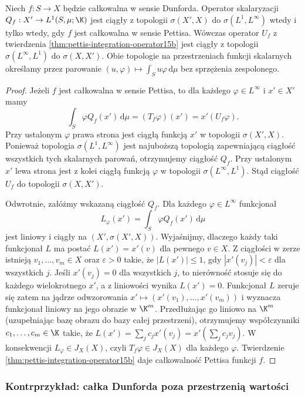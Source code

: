 \begin{wniosek}
\label{cor:pettis-weakstar-operator15b}
Niech $f:S\to X$ będzie całkowalna w sensie Dunforda.
Operator skalaryzacji
$Q_f:X'\to L^1(S,\mu;\K)$ jest ciągły z topologii
$\sigma(X',X)$ do $\sigma(L^1,L^\infty)$ wtedy i tylko wtedy,
gdy $f$ jest całkowalna w sensie Pettisa.
Wówczas operator $U_f$ z twierdzenia
\ref{thm:pettis-integration-operator15b} jest ciągły
z topologii $\sigma(L^\infty,L^1)$ do $\sigma(X,X')$.
Obie topologie na przestrzeniach funkcji skalarnych
określamy przez parowanie
$(u,\varphi)\mapsto\int_Su\varphi\,\mathrm d\mu$
bez sprzężenia zespolonego.
\end{wniosek}
\begin{proof}
Jeżeli $f$ jest całkowalna w sensie Pettisa, to dla
każdego $\varphi\in L^\infty$ i $x'\in X'$ mamy
\[
 \int_S\varphi Q_f(x')\,\mathrm d\mu
 = (T_f\varphi)(x')=x'(U_f\varphi).
\]
Przy ustalonym $\varphi$ prawa strona jest ciągłą
funkcją $x'$ w topologii $\sigma(X',X)$.
Ponieważ topologia $\sigma(L^1,L^\infty)$ jest
najuboższą topologią zapewniającą ciągłość wszystkich
tych skalarnych parowań, otrzymujemy ciągłość $Q_f$.
Przy ustalonym $x'$ lewa strona jest z kolei ciągłą
funkcją $\varphi$ w topologii $\sigma(L^\infty,L^1)$.
Stąd ciągłość $U_f$ do topologii $\sigma(X,X')$.

Odwrotnie, załóżmy wskazaną ciągłość $Q_f$.
Dla każdego $\varphi\in L^\infty$ funkcjonał
\[
 L_\varphi(x')=\int_S\varphi Q_f(x')\,\mathrm d\mu
\]
jest liniowy i ciągły na $(X',\sigma(X',X))$.
Wyjaśnijmy, dlaczego każdy taki funkcjonał $L$ ma postać
$L(x')=x'(v)$ dla pewnego $v\in X$.
Z ciągłości w zerze istnieją $v_1,\ldots,v_m\in X$
oraz $\varepsilon>0$ takie, że
$|L(x')|\le1$, gdy $|x'(v_j)|<\varepsilon$
dla wszystkich $j$. Jeśli $x'(v_j)=0$ dla wszystkich $j$,
to nierówność stosuje się do każdego wielokrotnego
$x'$, a z liniowości wynika $L(x')=0$.
Funkcjonał $L$ zeruje się zatem na jądrze odwzorowania
$x'\mapsto(x'(v_1),\ldots,x'(v_m))$ i wyznacza
funkcjonał liniowy na jego obrazie w $\K^m$.
Przedłużając go liniowo na $\K^m$ (uzupełniając bazę
obrazu do bazy całej przestrzeni), otrzymujemy
współczynniki $c_1,\ldots,c_m\in\K$ takie, że
$L(x')=\sum_j c_jx'(v_j)=x'(\sum_jc_jv_j)$.
W konsekwencji $L_\varphi\in J_X(X)$, czyli
$T_f\varphi\in J_X(X)$ dla każdego $\varphi$.
Twierdzenie \ref{thm:pettis-integration-operator15b}
daje całkowalność Pettisa funkcji $f$.
\end{proof}

\subsubsection{Kontrprzykład: całka Dunforda poza przestrzenią wartości}

